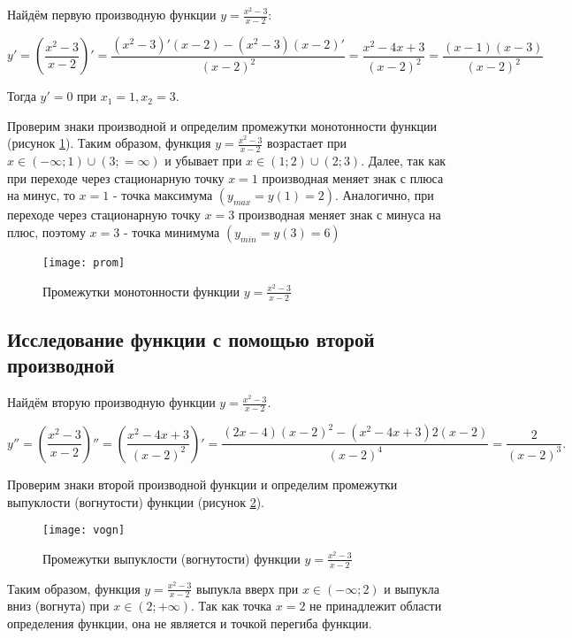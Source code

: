 Найдём первую производную функции $y = \frac{x^2-3}{x-2}$:

\[y' = (\frac{x^2-3}{x-2})' = \frac{(x^2-3)'(x-2)-(x^2-3)(x-2)'}{(x-2)^2}  = \frac{x^2-4x+3}{(x-2)^2} = \frac{(x-1)(x-3)}{(x-2)^2}\]

Тогда $y' = 0$ при $x_1 = 1, x_2 = 3$.

Проверим знаки производной и определим промежутки монотонности функции (рисунок \ref{pic:prom}). Таким образом, функция $y = \frac{x^2-3}{x-2}$ возрастает при $x \in (-\infty;1) \cup (3; =\infty)$ и убывает при $x \in (1;2) \cup (2;3)$. Далее, так как при переходе через стационарную точку $x = 1$ производная меняет знак с плюса на минус, то $x=1$ - точка максимума $(y_{max} = y(1) = 2)$. Аналогично, при переходе через стационарную точку
$x = 3$ производная меняет знак с минуса на плюс, поэтому $x = 3$ - точка минимума $(y_{min} = y(3) = 6)$

\begin{figure}[H]
	\begin{center}
		\texttt{[image: prom]}
		\caption{Промежутки монотонности функции $y = \frac{x^2-3}{x-2}$}
		\label{pic:prom}
	\end{center}
\end{figure}

\subsection{Исследование функции с помощью второй производной}

Найдём вторую производную функции $y = \frac{x^2-3}{x-2}$. 

\[y'' = (\frac{x^2-3}{x-2})'' = (\frac{x^2-4x+3}{(x-2)^2})' = \frac{(2x-4)(x-2)^2 - (x^2-4x+3)2(x-2)}{(x-2)^4} = \frac{2}{(x-2)^3}.\]

Проверим знаки второй производной функции и определим промежутки выпуклости (вогнутости) функции (рисунок \ref{pic:vogn}).

\begin{figure}[H]
	\begin{center}
		\texttt{[image: vogn]}
		\caption{Промежутки выпуклости (вогнутости) функции $y = \frac{x^2-3}{x-2}$}
		\label{pic:vogn}
	\end{center}
\end{figure}

Таким образом, функция $y = \frac{x^2-3}{x-2}$ выпукла вверх при $x \in (-\infty; 2)$ и выпукла вниз (вогнута) при $x \in (2; +\infty)$. Так как точка $x = 2$ не принадлежит области определения функции, она не является и точкой перегиба функции.

